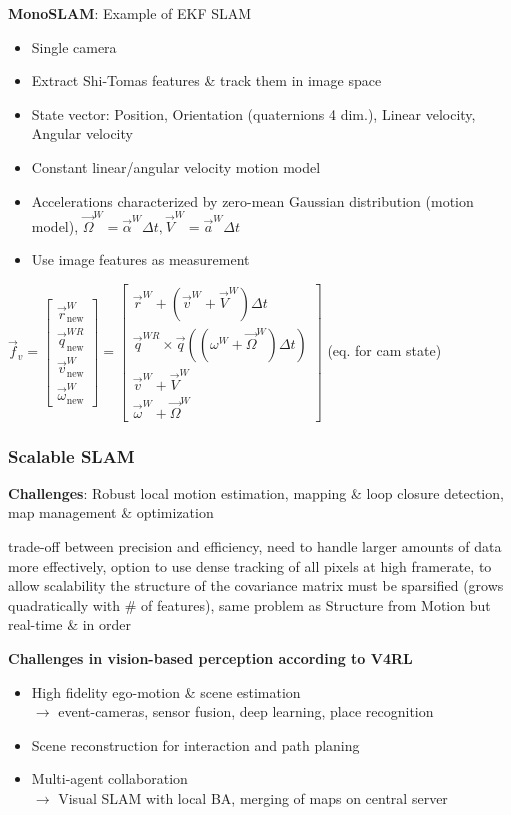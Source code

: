 \documentclass[fontsize=6pt]{scrartcl}
\begin{document}
\begin{multicols*}{4}
\textbf{MonoSLAM}: Example of EKF SLAM

\begin{itemize}
	\item Single camera
	\item Extract Shi-Tomas features \& track them in image space
	\item State vector: Position, Orientation (quaternions 4 dim.), Linear velocity, Angular velocity
	\item Constant linear/angular velocity motion model
	\item Accelerations characterized by zero-mean Gaussian distribution (motion model), $\vec \Omega^W = \vec{\alpha}^W\Delta t, \vec V^W = \vec{a}^W\Delta t$
	\item Use image features as measurement
\end{itemize}

{\centering 
	$
	\vec f_v
	=
	\left[
	\begin{matrix}
	\vec r_\mathrm{new}^W \\
	\vec q_\mathrm{new}^{WR} \\
	\vec v_\mathrm{new}^W \\
	\vec \omega_\mathrm{new}^W
	\end{matrix}
	\right]
	=
	\left[
	\begin{matrix}
	\vec r^W
	+ (\vec v^W + \vec V^W)\Delta t \\
	\vec q^{WR}
	\times \vec q((\omega^W+\vec\Omega^W)\Delta t)\\
	\vec v^W + \vec V^W\\
	\vec \omega^W + \vec \Omega^W
	\end{matrix}
	\right]
	$ (eq. for cam state)
\par}

\subsubsection*{Scalable SLAM}
\textbf{Challenges}: Robust local motion estimation, mapping \& loop closure detection, map management \& optimization

trade-off between precision and efficiency, need to handle larger amounts of data more effectively,	option to use dense tracking of all pixels at high framerate, to allow scalability the structure of the covariance matrix must be sparsified (grows quadratically with \# of features), same problem as Structure from Motion but real-time \& in order

\textbf{Challenges in vision-based perception according to V4RL}
\begin{itemize}
	\item High fidelity ego-motion \& scene estimation \\
	$\rightarrow$ event-cameras, sensor fusion, deep learning, place recognition
	\item Scene reconstruction for interaction and path planing
	\item Multi-agent collaboration\\
	$\rightarrow$ Visual SLAM with local BA, merging of maps on central server
\end{itemize}


\end{multicols*}
\end{document}
